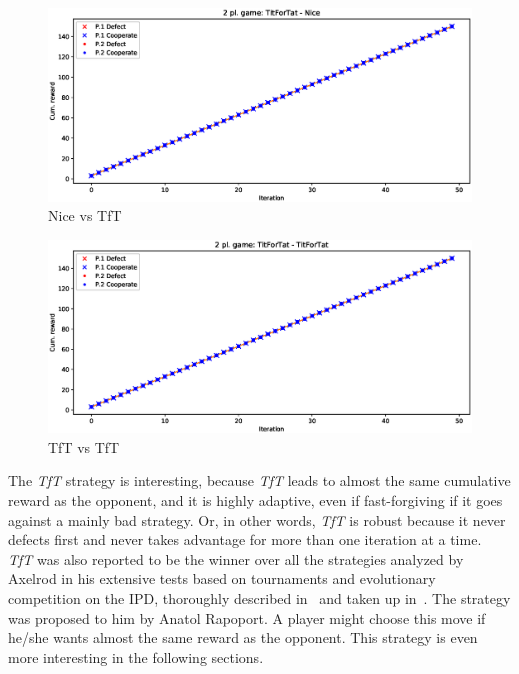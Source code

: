 \documentclass[journal,a4paper,10pt,twoside]{IEEEtran} %
\begin{document}
\begin{figure}[!ht]
    \centering
    \includegraphics[width=1\columnwidth]{../img/ipd2p/ipd2p-rewards-TitForTat-Nice}
    \caption{Nice vs TfT}
    \label{fig:nicevstft}
\end{figure}

\begin{figure}[!ht]
    \centering
    \includegraphics[width=1\columnwidth]{../img/ipd2p/ipd2p-rewards-TitForTat-TitForTat}
    \caption{TfT vs TfT}
    \label{fig:tftvstft}
\end{figure}

The \textit{TfT} strategy is interesting, because \textit{TfT} leads to almost the same cumulative reward as the opponent, and it is highly adaptive, even if fast-forgiving if it goes against a mainly bad strategy.
Or, in other words, \textit{TfT} is robust because it never defects first and never takes advantage for more than one iteration at a time.~\cite{fogelEvolvingBehaviors}
\textit{TfT} was also reported to be the winner over all the strategies analyzed by Axelrod in his extensive tests based on tournaments and evolutionary competition on the IPD, thoroughly described in~\cite{axelrod1981evolution,axelrod1984evolution} and taken up in~\cite{mathieu2017}.
The strategy was proposed to him by Anatol Rapoport.
A player might choose this move if he/she wants almost the same reward as the opponent. This strategy is even more interesting in the following sections.
\end{document}
